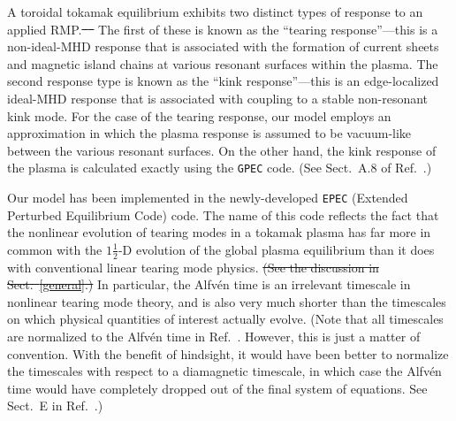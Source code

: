\documentclass[12pt,prb,aps]{revtex4-1}
\providecommand{\DIFadd}[1]{{\protect\color{blue}\uwave{#1}}} %
\providecommand{\DIFdel}[1]{{\protect\color{red}\sout{#1}}}                      %
\providecommand{\DIFaddbegin}{} %
\providecommand{\DIFaddend}{} %
\providecommand{\DIFdelbegin}{} %
\providecommand{\DIFdelend}{} %
\begin{document}
A toroidal tokamak equilibrium exhibits two distinct types of response to an applied RMP.\DIFdelbegin \DIFdel{\mbox{%
\cite{paz1,kink0,kink1}
}\hspace{0pt}%
}\DIFdelend \DIFaddbegin \DIFadd{\mbox{%
\cite{paz,kink0,kink1}
}\hspace{0pt}%
}\DIFaddend The first of these is known as the ``tearing response''---this is a non-ideal-MHD response that is associated with the
formation of current sheets and magnetic island chains at various resonant surfaces within the plasma. The second
response type is known as the ``kink response''---this is an edge-localized ideal-MHD response that is associated
with coupling to a stable non-resonant kink mode. For the case of the tearing response, our model employs an
approximation in which the plasma response is assumed to be vacuum-like between the various resonant surfaces. On the other hand,
the kink response of the plasma is calculated exactly using the {\tt GPEC} code.\cite{ipec,gpec} (See Sect.~A.8 of Ref.~.)

Our model has been implemented in the newly-developed {\tt EPEC} (Extended Perturbed Equilibrium Code) code. The name
of this code reflects the fact that the nonlinear evolution of tearing modes in a
tokamak plasma has far more in common with the $1\tfrac{1}{2}$-D
evolution of the global plasma equilibrium than it does with
conventional linear tearing mode physics. \DIFdelbegin \DIFdel{(See the discussion in Sect.~\ref{general}.) }\DIFdelend In particular, the Alfv\'{e}n time is
an irrelevant  timescale in nonlinear tearing mode theory, and
is also  very much shorter than the timescales on which
physical quantities of interest actually evolve. (Note that all timescales are normalized to the Alfv\'{e}n time
in Ref.~. However, this is just a matter of convention. With the benefit of hindsight, it would
have been better to normalize the timescales with respect to a diamagnetic timescale, in which case the Alfv\'{e}n time would have completely dropped
out of the final system of equations. See Sect.~E in Ref.~.)
\end{document}
